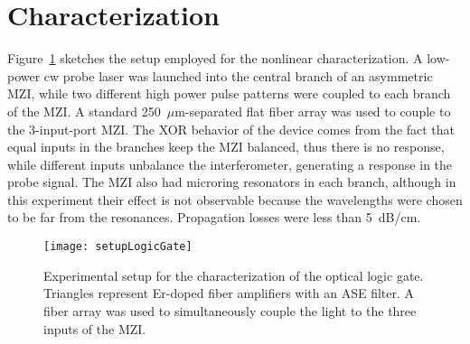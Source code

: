 \section{Characterization}
Figure~\ref{fig:setupLogicGate} sketches the setup employed for the nonlinear characterization. A low-power cw probe laser was launched into the central branch of an asymmetric MZI, while two different high power pulse patterns were coupled to each branch of the MZI. A standard 250~$\mu$m-separated flat fiber array was used to couple to the 3-input-port MZI. The XOR behavior of the device comes from the fact that equal inputs in the branches keep the MZI balanced, thus there is no response, while different inputs unbalance the interferometer, generating a response in the probe signal. The MZI also had microring resonators in each branch, although in this experiment their effect is not observable because the wavelengths were chosen to be far from the resonances. Propagation losses were less than 5~dB/cm.

\begin{figure}[htb]
    \centering
    \texttt{[image: setupLogicGate]}
      \caption{Experimental setup for the characterization of the optical logic gate. Triangles represent Er-doped fiber amplifiers with an ASE filter. A fiber array was used to simultaneously couple the light to the three inputs of the MZI.}
    \label{fig:setupLogicGate}
\end{figure}


